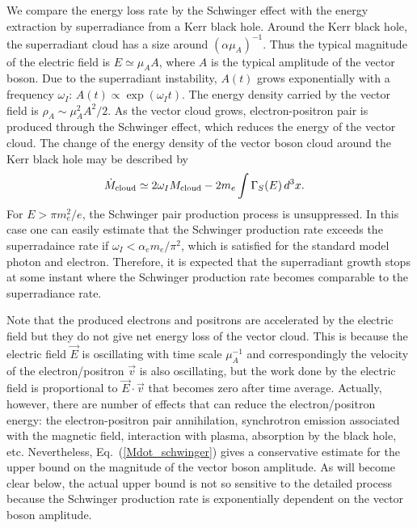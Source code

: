 \documentclass[%
 preprint,
 nofootinbib,
 amsmath,amssymb,
 aps,
 a4paper
]{revtex4-1}
\begin{document}
We compare the energy loss rate by the Schwinger effect with the energy extraction by superradiance from a Kerr black hole. 
Around the Kerr black hole, the superradiant cloud has a size around $(\alpha \mu_A)^{-1}$. Thus the typical magnitude of the electric field is $E \simeq \mu_A A$, where $A$ is the typical amplitude of the vector boson. Due to the superradiant instability, $A(t)$ grows exponentially with a frequency $\omega_I$: $A(t) \propto \exp(\omega_I t)$. The energy density carried by the vector field is $\rho_A \sim \mu_A^2 A^2/2$. As the vector cloud grows, electron-positron pair is produced through the Schwinger effect, which reduces the energy of the vector cloud. The change of the energy density of the vector boson cloud around the Kerr black hole may be described by
\begin{align}
	&\dot M_\text{cloud} \simeq 2\omega_I M_{\rm cloud} - 2m_e \int \Gamma_S(E)\,d^3 x.
	\label{Mdot_schwinger}
\end{align}
For $E > \pi m_e^2 / e$, the Schwinger pair production process is unsuppressed. In this case one can easily estimate that the Schwinger production rate exceeds the superradaince rate if $\omega_I < \alpha_e m_e/\pi^2$, which is satisfied for the standard model photon and electron.
Therefore, it is expected that the superradiant growth stops at some instant where the Schwinger production rate becomes comparable to the superradiance rate.

Note that the produced electrons and positrons are accelerated by the electric field but they do not give net energy loss of the vector cloud. This is because the electric field $\vec E$ is oscillating with time scale $\mu_A^{-1}$ and correspondingly the velocity of the electron/positron $\vec v$ is also oscillating, but the work done by the electric field is proportional to $\vec E\cdot \vec v$ that becomes zero after time average.
Actually, however, there are number of effects that can reduce the electron/positron energy: the electron-positron pair annihilation, synchrotron emission associated with the magnetic field, interaction with plasma, absorption by the black hole, etc. 
Nevertheless, Eq.~(\ref{Mdot_schwinger}) gives a conservative estimate for the upper bound on the magnitude of the vector boson amplitude. 
As will become clear below, the actual upper bound is not so sensitive to the detailed process because the Schwinger production rate is exponentially dependent on the vector boson amplitude.
\end{document}
